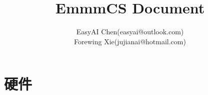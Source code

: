 \documentclass[10pt,fancyhdr,UTF8]{ctexbook}
\title{EmmmCS Document}
\author{
        EasyAI Chen(easyai@outlook.com)\\
        Forewing Xie(jujianai@hotmail.com)
    }
\begin{document}
\begin{sloppypar}
\maketitle
\tableofcontents
\mainmatter

\part{硬件}





\end{sloppypar}
\end{document}
